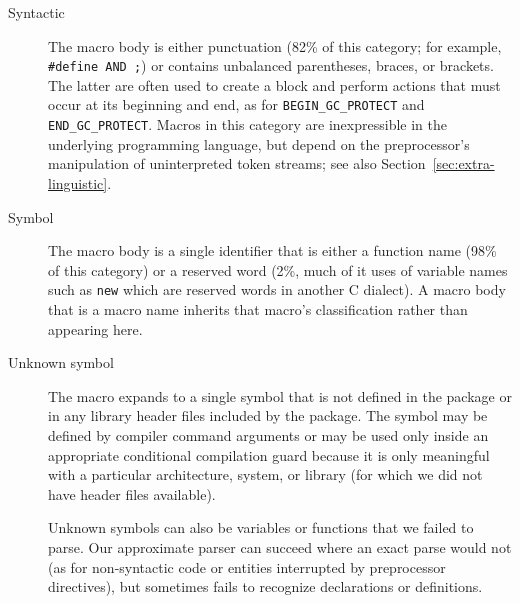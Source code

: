 \documentclass[10pt]{article}
\begin{document}
\begin{description}
\item[Syntactic]  The macro body is either punctuation (82\% of this
  category; for example, {\tt \#define AND ;}) or contains unbalanced
  parentheses, braces, or brackets.  The latter are often used to create a
  block and perform actions that must occur at its beginning and end, as
  for \verb|BEGIN_GC_PROTECT| and \verb|END_GC_PROTECT|.
  Macros in this category are inexpressible in the underlying programming
  language, but depend on the preprocessor's manipulation of uninterpreted
  token streams; see also Section~\ref{sec:extra-linguistic}.


\item[Symbol]
  The macro body is a single identifier that is either a function name
  (98\% of this category) or a reserved word (2\%, much of it uses of
  variable names such as {\tt new} which are reserved words in another
  C dialect).  A macro body that is a macro name inherits that macro's
  classification rather than appearing here.


\item[Unknown symbol]
  The macro expands to a single symbol that is not defined in the package
  or in any library header files included by the package.  The symbol may
  be defined by compiler command arguments or may be used only inside an
  appropriate conditional compilation guard because it is only meaningful
  with a particular architecture, system, or library (for which we did not
  have header files available).
  
  Unknown symbols can also be variables or functions that we failed to
  parse.  Our approximate parser can succeed where an exact parse would not
  (as for non-syntactic code or entities interrupted by preprocessor
  directives), but sometimes fails to recognize declarations or
  definitions.



\end{description}
\end{document}
